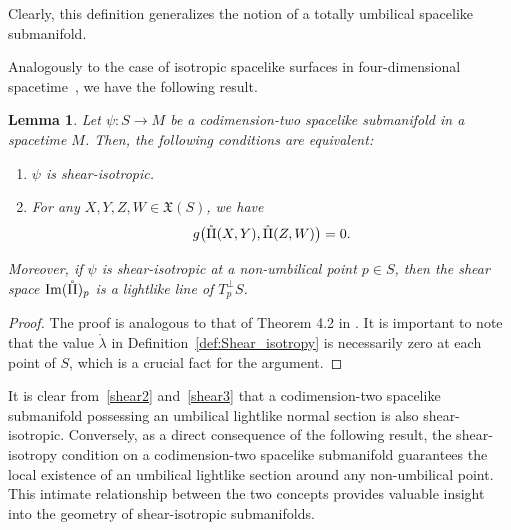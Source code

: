 \documentclass[11pt]{article}
\numberwithin{equation}{section}
\newtheorem{lemma}[theorem]{Lemma}
\begin{document}
Clearly, this definition generalizes the notion of a totally umbilical spacelike submanifold.

Analogously to the case of isotropic spacelike surfaces in four-dimensional spacetime~\cite{Cab1}, we have the following result. 
	
	\begin{lemma} \label{CarShearIso}
		Let $\psi \colon S \to M$ be a codimension-two spacelike submanifold in a spacetime $M$. Then, the following conditions are equivalent:
		\begin{enumerate}
			\item $\psi$ is shear-isotropic.
			\item For any $X, Y, Z, W \in {\mathfrak X}(S)$, we have
			\[
			g\bigl(\mathring{{\rm II}}(X, Y), \mathring{{\rm II}}(Z, W)\bigr) = 0.
			\]
		\end{enumerate}
		
		Moreover, if $\psi$ is shear-isotropic at a non-umbilical point $p\in S$, then the shear space $\operatorname{Im}(\mathring{{\rm II}})_p$ is a  lightlike line of $T_p^\perp S$.
	\end{lemma}	
	\begin{proof}
		The proof is analogous to that of Theorem 4.2 in \cite{Cab1}. It is important to note that the value $\mathring{\lambda}$ in Definition~\ref{def:Shear_isotropy} is necessarily zero at each point of $S$, which is a crucial fact for the argument.
	\end{proof}
	
	It is clear from~\eqref{shear2} and~\eqref{shear3} that a codimension-two spacelike submanifold possessing an umbilical lightlike normal section is also shear-isotropic. Conversely, as a direct consequence of the following result, the shear-isotropy condition on a codimension-two spacelike submanifold guarantees the local existence of an umbilical lightlike section around any non-umbilical point. This intimate relationship between the two concepts provides valuable insight into the geometry of shear-isotropic submanifolds.
	
\end{document}
